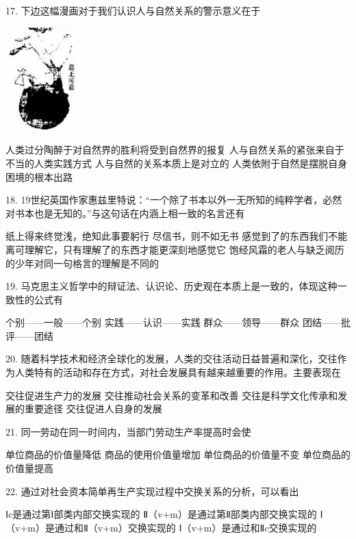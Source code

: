 17. 下边这幅漫画对于我们认识人与自然关系的警示意义在于
\begin{center}\includegraphics[height=4cm]{17.jpg}\end{center}
\begin{choices}
	 人类过分陶醉于对自然界的胜利将受到自然界的报复
	 人与自然关系的紧张来自于不当的人类实践方式
	 人与自然的关系本质上是对立的
	 人类依附于自然是摆脱自身困境的根本出路
\end{choices}
18. 19世纪英国作家惠兹里特说：“一个除了书本以外一无所知的纯粹学者，必然对书本也是无知的。”与这句话在内涵上相一致的名言还有
\begin{choices}
	 纸上得来终觉浅，绝知此事要躬行
	 尽信书，则不如无书
	 感觉到了的东西我们不能离可理解它，只有理解了的东西才能更深刻地感觉它
	 饱经风霜的老人与缺乏阅历的少年对同一句格言的理解是不同的
\end{choices}
19. 马克思主义哲学中的辩证法、认识论、历史观在本质上是一致的，体现这种一致性的公式有
\begin{choices}
	 个别——一般——个别
	 实践——认识——实践
	 群众——领导——群众
	 团结——批评——团结
\end{choices}
20. 随着科学技术和经济全球化的发展，人类的交往活动日益普遍和深化，交往作为人类特有的活动和存在方式，对社会发展具有越来越重要的作用。主要表现在
\begin{choices}
	 交往促进生产力的发展
	 交往推动社会关系的变革和改善
	 交往是科学文化传承和发展的重要途径
	 交往促进人自身的发展
\end{choices}
21. 同一劳动在同一时间内，当部门劳动生产率提高时会使
\begin{choices}
	 单位商品的价值量降低
	 商品的使用价值量增加
	 单位商品的价值量不变
	 单位商品的价值量提高
\end{choices}
22. 通过对社会资本简单再生产实现过程中交换关系的分析，可以看出
\begin{choices}
	 Ⅰc是通过第Ⅰ部类内部交换实现的
	 Ⅱ（v+m）是通过第Ⅱ部类内部交换实现的
	 Ⅰ（v+m）是通过和Ⅱ（v+m）交换实现的
	 Ⅰ（v+m）是通过和Ⅱc交换实现的
\end{choices}
